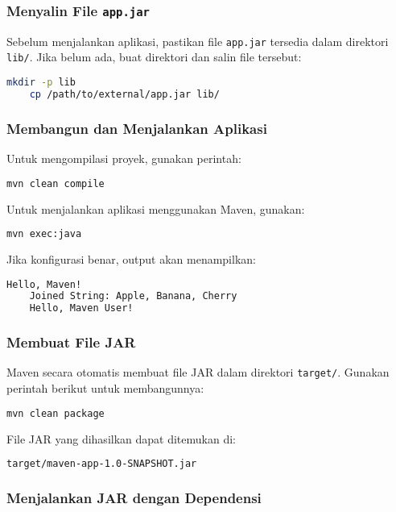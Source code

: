 \subsubsection{Menyalin File \texttt{app.jar}}

Sebelum menjalankan aplikasi, pastikan file \texttt{app.jar} tersedia dalam direktori \texttt{lib/}. Jika belum ada, buat direktori dan salin file tersebut:

\begin{lstlisting}[language=bash]
	mkdir -p lib
	cp /path/to/external/app.jar lib/
\end{lstlisting}

\subsubsection{Membangun dan Menjalankan Aplikasi}

Untuk mengompilasi proyek, gunakan perintah:
\begin{lstlisting}[language=bash]
	mvn clean compile
\end{lstlisting}

Untuk menjalankan aplikasi menggunakan Maven, gunakan:
\begin{lstlisting}[language=bash]
	mvn exec:java
\end{lstlisting}

Jika konfigurasi benar, output akan menampilkan:
\begin{lstlisting}[language=bash]
	Hello, Maven!
	Joined String: Apple, Banana, Cherry
	Hello, Maven User!
\end{lstlisting}

\subsubsection{Membuat File JAR}

Maven secara otomatis membuat file JAR dalam direktori \texttt{target/}. Gunakan perintah berikut untuk membangunnya:
\begin{lstlisting}[language=bash]
	mvn clean package
\end{lstlisting}

File JAR yang dihasilkan dapat ditemukan di:
\begin{lstlisting}[language=bash]
	target/maven-app-1.0-SNAPSHOT.jar
\end{lstlisting}

\subsubsection{Menjalankan JAR dengan Dependensi}

